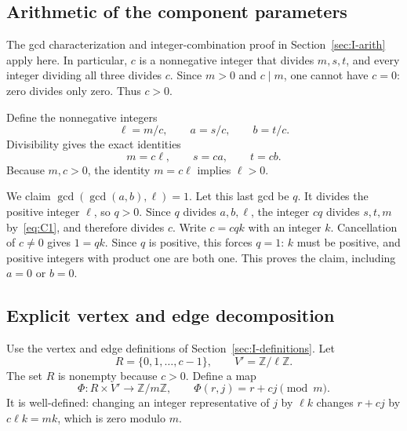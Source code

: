 \documentclass{article}
\numberwithin{equation}{section}
\begin{document}
\subsection{Arithmetic of the component parameters}\label{sec:II-arith}

The gcd characterization and integer-combination proof in Section~\ref{sec:I-arith}
apply here. In particular, \(c\) is a nonnegative
integer that divides \(m,s,t\), and every integer dividing all three divides
\(c\). Since \(m>0\) and \(c\mid m\), one cannot have \(c=0\): zero divides only
zero. Thus \(c>0\).

Define the nonnegative integers
\begin{equation}\label{eq:quotients}
  \ell=m/c,\qquad a=s/c,\qquad b=t/c.
\end{equation}
Divisibility gives the exact identities
\begin{equation}\label{eq:C1}
  m=c\ell,\qquad s=ca,\qquad t=cb.
\end{equation}
Because \(m,c>0\), the identity \(m=c\ell\) implies \(\ell>0\).

We claim \(\gcd(\gcd(a,b),\ell)=1\). Let this last gcd be \(q\).
It divides the positive integer \(\ell\), so \(q>0\). Since \(q\) divides
\(a,b,\ell\), the integer \(cq\) divides \(s,t,m\) by~\eqref{eq:C1}, and therefore
divides \(c\). Write \(c=cqk\) with an integer \(k\). Cancellation of
\(c\ne0\) gives \(1=qk\). Since \(q\) is positive, this forces \(q=1\):
\(k\) must be positive, and positive integers with product one are both one.
This proves the claim, including \(a=0\) or \(b=0\).

\subsection{Explicit vertex and edge decomposition}\label{sec:II-decomposition}

Use the vertex and edge definitions of Section~\ref{sec:I-definitions}. Let
\begin{equation}\label{eq:R-Vprime}
  R=\{0,1,\ldots,c-1\},\qquad V'=\mathbb Z/\ell\mathbb Z.
\end{equation}
The set \(R\) is nonempty because \(c>0\). Define a map
\begin{equation}\label{eq:C2}
  \Phi:R\times V'\longrightarrow\mathbb Z/m\mathbb Z,\qquad
  \Phi(r,j)=r+cj\pmod m.
\end{equation}
It is well-defined: changing an integer representative of \(j\) by \(\ell k\)
changes \(r+cj\) by \(c\ell k=mk\), which is zero modulo \(m\).
\end{document}
